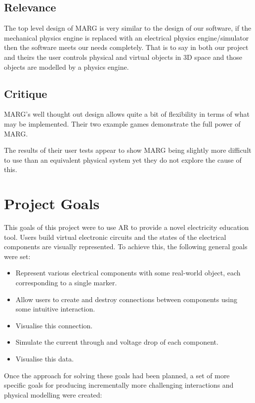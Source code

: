\subsection{Relevance}
The top level design of MARG is very similar to the design of our software, if the mechanical physics engine is replaced with an electrical physics engine/simulator then the software meets our needs completely. That is to say in both our project and theirs the user controls physical and virtual objects in 3D space and those objects are modelled by a physics engine.

\subsection{Critique}
MARG's well thought out design allows quite a bit of flexibility in terms of what may be implemented. Their two example games demonstrate the full power of MARG.

The results of their user tests appear to show MARG being slightly more difficult to use than an equivalent physical system yet they do not explore the cause of this.


\section{Project Goals}

This goals of this project were to use AR to provide a novel electricity education tool. Users build virtual electronic circuits and the states of the electrical components are visually represented. To achieve this, the following general goals were set:

\begin{itemize}
\item Represent various electrical components with some real-world object, each corresponding to a single marker.
\item Allow users to create and destroy connections between components using some intuitive interaction.
\item Visualise this connection.
\item Simulate the current through and voltage drop of each component.
\item Visualise this data.
\end{itemize}

Once the approach for solving these goals had been planned, a set of more specific goals for producing incrementally more challenging interactions and physical modelling were created:

